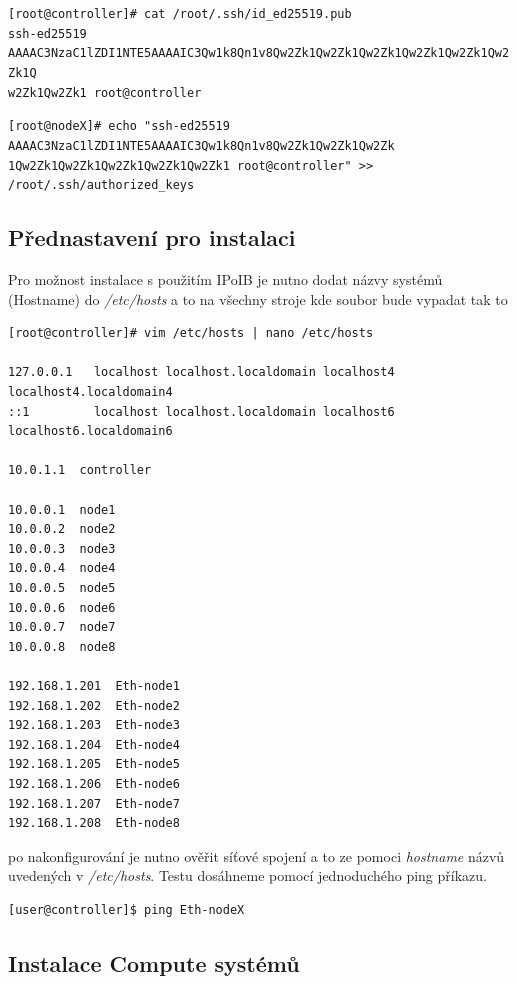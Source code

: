 \begin{small}
\texttt{[root@controller]\# cat /root/.ssh/id\_ed25519.pub}\\
\texttt{ssh-ed25519 AAAAC3NzaC1lZDI1NTE5AAAAIC3Qw1k8Qn1v8Qw2Zk1Qw2Zk1Qw2Zk1Qw2Zk1Qw2Zk1Qw2Zk1Q\\w2Zk1Qw2Zk1 root@controller}

\texttt{[root@nodeX]\# echo "ssh-ed25519 AAAAC3NzaC1lZDI1NTE5AAAAIC3Qw1k8Qn1v8Qw2Zk1Qw2Zk1Qw2Zk\\1Qw2Zk1Qw2Zk1Qw2Zk1Qw2Zk1Qw2Zk1 root@controller" \textgreater{}\textgreater{} /root/.ssh/authorized\_keys}
\end{small}

\newpage

\subsection{Přednastavení pro instalaci}
Pro možnost instalace s použitím IPoIB je nutno dodat názvy systémů (Hostname) do \textit{/etc/hosts} a to na všechny stroje kde soubor bude vypadat tak to
\begin{verbatim}
[root@controller]# vim /etc/hosts | nano /etc/hosts

127.0.0.1   localhost localhost.localdomain localhost4 localhost4.localdomain4
::1         localhost localhost.localdomain localhost6 localhost6.localdomain6

10.0.1.1  controller

10.0.0.1  node1
10.0.0.2  node2
10.0.0.3  node3
10.0.0.4  node4
10.0.0.5  node5
10.0.0.6  node6
10.0.0.7  node7
10.0.0.8  node8

192.168.1.201  Eth-node1
192.168.1.202  Eth-node2
192.168.1.203  Eth-node3
192.168.1.204  Eth-node4
192.168.1.205  Eth-node5
192.168.1.206  Eth-node6
192.168.1.207  Eth-node7
192.168.1.208  Eth-node8
\end{verbatim}

po nakonfigurování je nutno ověřit síťové spojení a to ze pomoci \textit{hostname} názvů uvedených v \textit{/etc/hosts}. Testu dosáhneme pomocí jednoduchého ping příkazu.

\begin{verbatim}
[user@controller]$ ping Eth-nodeX
\end{verbatim}

\subsection{Instalace Compute systémů}

